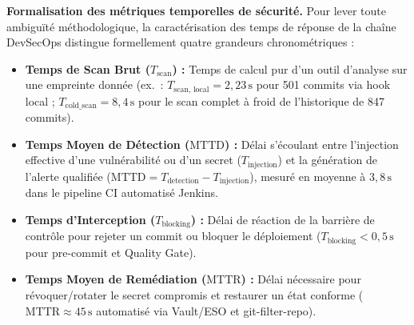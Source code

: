 \textbf{Formalisation des métriques temporelles de sécurité.} Pour lever toute ambiguïté méthodologique, la caractérisation des temps de réponse de la chaîne DevSecOps distingue formellement quatre grandeurs chronométriques :
\begin{itemize}
    \item \textbf{Temps de Scan Brut ($T_{\text{scan}}$) :} Temps de calcul pur d'un outil d'analyse sur une empreinte donnée (ex.~: $T_{\text{scan, local}} = 2{,}23\,\text{s}$ pour 501 commits via hook local ; $T_{\text{cold\_scan}} = 8{,}4\,\text{s}$ pour le scan complet à froid de l'historique de 847 commits).
    \item \textbf{Temps Moyen de Détection ($\text{MTTD}$) :} Délai s'écoulant entre l'injection effective d'une vulnérabilité ou d'un secret ($T_{\text{injection}}$) et la génération de l'alerte qualifiée ($\text{MTTD} = T_{\text{detection}} - T_{\text{injection}}$), mesuré en moyenne à $3{,}8\,\text{s}$ dans le pipeline CI automatisé Jenkins.
    \item \textbf{Temps d'Interception ($T_{\text{blocking}}$) :} Délai de réaction de la barrière de contrôle pour rejeter un commit ou bloquer le déploiement ($T_{\text{blocking}} < 0{,}5\,\text{s}$ pour pre-commit et Quality Gate).
    \item \textbf{Temps Moyen de Remédiation ($\text{MTTR}$) :} Délai nécessaire pour révoquer/rotater le secret compromis et restaurer un état conforme ($\text{MTTR} \approx 45\,\text{s}$ automatisé via Vault/ESO et git-filter-repo).
\end{itemize}

